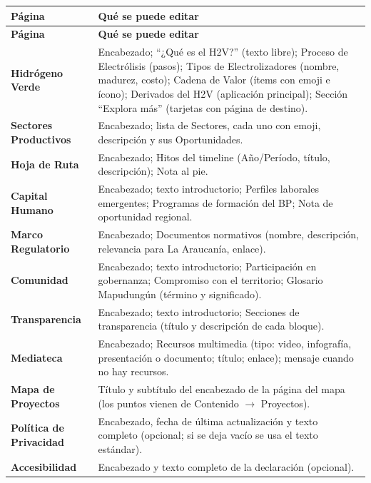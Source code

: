 \documentclass[11pt,letterpaper]{report}
\begin{document}
\begin{longtable}{>{\raggedright\arraybackslash}p{}>{\raggedright\arraybackslash}p{}}
\rowcolor{h2vazul}\textbf{\color{white}Página} & \textbf{\color{white}Qué se puede editar} \\
\endfirsthead
\rowcolor{h2vazul}\textbf{\color{white}Página} & \textbf{\color{white}Qué se puede editar} \\
\endhead
\textbf{Hidrógeno Verde} & Encabezado; “¿Qué es el H2V?” (texto libre); Proceso de Electrólisis (pasos); Tipos de Electrolizadores (nombre, madurez, costo); Cadena de Valor (ítems con emoji e ícono); Derivados del H2V (aplicación principal); Sección “Explora más” (tarjetas con página de destino). \\ \midrule
\rowcolor{filaalt}\textbf{Sectores Productivos} & Encabezado; lista de Sectores, cada uno con emoji, descripción y sus Oportunidades. \\ \midrule
\textbf{Hoja de Ruta} & Encabezado; Hitos del timeline (Año/Período, título, descripción); Nota al pie. \\ \midrule
\rowcolor{filaalt}\textbf{Capital Humano} & Encabezado; texto introductorio; Perfiles laborales emergentes; Programas de formación del BP; Nota de oportunidad regional. \\ \midrule
\textbf{Marco Regulatorio} & Encabezado; Documentos normativos (nombre, descripción, relevancia para La Araucanía, enlace). \\ \midrule
\rowcolor{filaalt}\textbf{Comunidad} & Encabezado; texto introductorio; Participación en gobernanza; Compromiso con el territorio; Glosario Mapudungún (término y significado). \\ \midrule
\textbf{Transparencia} & Encabezado; texto introductorio; Secciones de transparencia (título y descripción de cada bloque). \\ \midrule
\rowcolor{filaalt}\textbf{Mediateca} & Encabezado; Recursos multimedia (tipo: video, infografía, presentación o documento; título; enlace); mensaje cuando no hay recursos. \\ \midrule
\textbf{Mapa de Proyectos} & Título y subtítulo del encabezado de la página del mapa (los puntos vienen de Contenido $\rightarrow$ Proyectos). \\ \midrule
\rowcolor{filaalt}\textbf{Política de Privacidad} & Encabezado, fecha de última actualización y texto completo (opcional; si se deja vacío se usa el texto estándar). \\ \midrule
\textbf{Accesibilidad} & Encabezado y texto completo de la declaración (opcional). \\ \bottomrule
\end{longtable}
\end{document}
